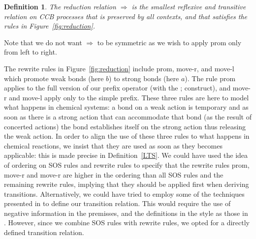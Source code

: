\documentclass[review]{elsarticle}
\newcommand{\rulename}[1]{\textsf{#1}}
\newtheorem{definition}{Definition}
\begin{document}
\begin{definition} \normalfont The reduction relation $\Rightarrow$ is the smallest reflexive and 
transitive relation on CCB processes that is preserved by all contexts, and that satisfies the rules 
in Figure~\ref{fig:reduction}.
\end{definition}
Note that we do not want $\Rightarrow$ to be symmetric as we wish to apply \rulename{prom} only 
from left to right. 

The rewrite rules in Figure~\ref{fig:reduction} include 
\rulename{prom}, \rulename{move-r}, and \rulename{move-l} which  
promote weak bonds (here $b$) to strong bonds (here $a$).
The rule \rulename{prom} applies to the full version of our prefix operator (with the ; construct), and
\rulename{move-r} and \rulename{move-l} apply only to the simple prefix.
These three rules are here to model what happens in chemical systems: a bond on a weak action is 
temporary and as soon as there is a strong action that can accommodate that bond (as the result
of concerted actions) the bond establishes itself on the strong action thus releasing the weak action.
In order to align the use of these three rules to what happens in chemical reactions, we insist
that they are used as soon as they becomes applicable: this is made 
precise in Definition~\ref{LTS}.
We could have used the idea of ordering on SOS rules and rewrite rules \cite{irek2002,mousavi}
to specify that the rewrite rules \rulename{prom}, \rulename{move-r} and \rulename{move-r} are higher 
in the ordering than all SOS rules and the remaining rewrite rules, implying that they should 
be applied first when deriving transitions. Alternatively, we could have tried to 
employ some of the techniques presented in \cite{Cleaveland2001711} to define our transition relation.
This would require the use of negative information in the premisses, and the definitions in the style
as those in \cite{irek2002,mousavi}.  However, since we combine SOS rules
with rewrite rules, we opted for a directly defined transition relation.
\end{document}
